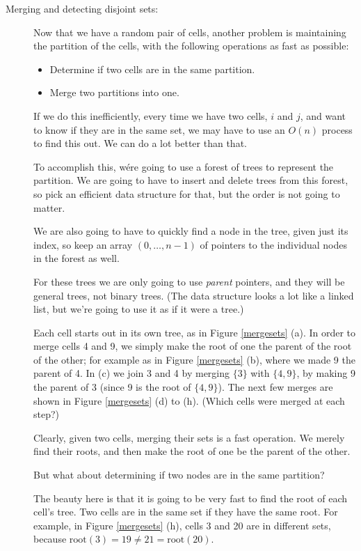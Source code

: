 \documentclass{article}
\newcommand{\set}[1]{\ensuremath{\{#1\}}}
\begin{document}
\begin{description}
\item[Merging  and detecting disjoint sets:]
  
Now that we have a random pair of cells, another problem is maintaining
the partition of the cells, with the following operations as fast as
possible: 
  \begin{itemize}
  \item Determine if two cells are in the same partition.
    \item Merge two partitions into one.
  \end{itemize}

If we do this inefficiently, every time we have two cells, $i$ and
$j$, and want to know if they are in the same set, we may have to use
an $O(n)$ process to find this out.  We can do a lot better than that.

  To accomplish this, wére going to use a forest of trees to represent
  the partition.  We are going to have to insert and delete trees from
  this forest, so pick an efficient data structure for that, but the
  order is not going to matter.

  We are also going to have to quickly find a node in the tree, given
  just its index, so keep an array $(0,\ldots,n-1)$ of pointers to the
  individual nodes in the forest as well.

For these trees we are only going to use {\em parent} pointers, and
they will be general trees, not binary trees.  (The data structure
looks a lot like a linked list, but we're going to use it as if it
were a tree.)

  Each cell starts out in its own tree, as in Figure \ref{mergesets}
  (a).  In order to merge cells 4 and 9, we simply make the root of
  one the parent of the root of the other; for example as in Figure
  \ref{mergesets} (b), where we made 9 the parent of 4.  In (c) we
  join 3 and 4 by merging \set{3} with \set{4,9}, by making 9 the
  parent of 3 (since 9 is the root of \set{4,9}).  The next few merges
  are shown in Figure \ref{mergesets} (d) to (h).  (Which cells were
  merged at each step?)

Clearly, given two cells, merging their sets is a fast operation.  We
merely find their roots, and then make the root of one be the parent
of the other.

But what about determining if two nodes are in the same partition?

The beauty here is that it is going to be very fast to find the root
of each cell's tree.  Two cells are in the same set if they have the
same root.  For example, in Figure \ref{mergesets} (h), cells 3 and 20
are in different sets, because $\mbox{root}(3) = 19 \not =
21 = \mbox{root}(20) $.




\end{description}
\end{document}
